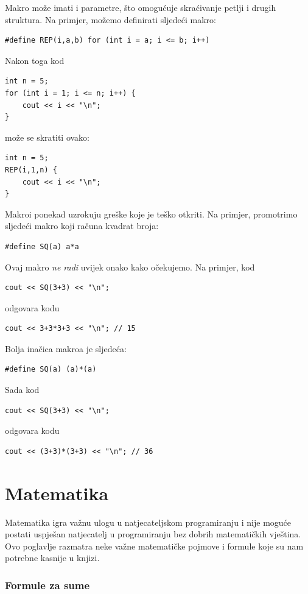Makro može imati i parametre,
što omogućuje skraćivanje petlji i drugih
struktura.
Na primjer, možemo definirati sljedeći makro:
\begin{lstlisting}
#define REP(i,a,b) for (int i = a; i <= b; i++)
\end{lstlisting}
Nakon toga kod
\begin{lstlisting}
int n = 5;
for (int i = 1; i <= n; i++) {
    cout << i << "\n";
}
\end{lstlisting}
može se skratiti ovako:
\begin{lstlisting}
int n = 5;
REP(i,1,n) {
    cout << i << "\n";
}
\end{lstlisting}

Makroi ponekad uzrokuju greške koje je teško
otkriti. Na primjer, promotrimo sljedeći makro
koji računa kvadrat broja:
\begin{lstlisting}
#define SQ(a) a*a
\end{lstlisting}
Ovaj makro \emph{ne radi} uvijek onako kako očekujemo.
Na primjer, kod
\begin{lstlisting}
cout << SQ(3+3) << "\n";
\end{lstlisting}
odgovara kodu
\begin{lstlisting}
cout << 3+3*3+3 << "\n"; // 15
\end{lstlisting}

Bolja inačica makroa je sljedeća:
\begin{lstlisting}
#define SQ(a) (a)*(a)
\end{lstlisting}
Sada kod
\begin{lstlisting}
cout << SQ(3+3) << "\n";
\end{lstlisting}
odgovara kodu
\begin{lstlisting}
cout << (3+3)*(3+3) << "\n"; // 36
\end{lstlisting}


\section{Matematika}

Matematika igra važnu ulogu u natjecateljskom
programiranju i nije moguće postati
uspješan natjecatelj u programiranju bez
dobrih matematičkih vještina.
Ovo poglavlje razmatra neke važne
matematičke pojmove i formule koje
su nam potrebne kasnije u knjizi.

\subsubsection{Formule za sume}

